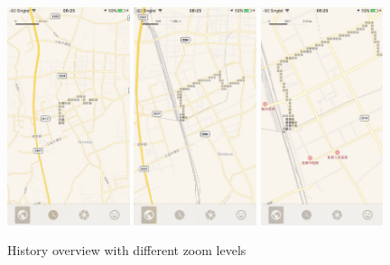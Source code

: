 \documentclass[12pt,a4paper]{article}
\begin{document}
                    \begin{figure}
                        \includegraphics[width=0.32\textwidth]{4-2-3-a}
                        \includegraphics[width=0.32\textwidth]{4-2-3-b}
                        \includegraphics[width=0.32\textwidth]{4-2-3-c}
                        \centering
                        \caption{History overview with different zoom levels}
                        \label{fig:cached-point-rendering}
                    \end{figure}
                    
\end{document}
